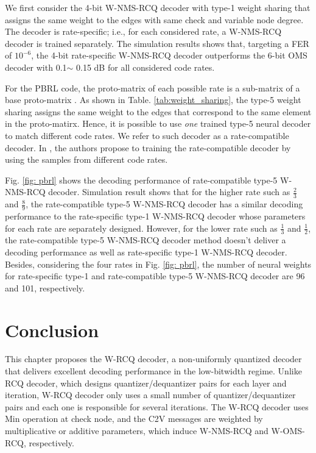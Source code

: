 \documentclass [PhD] {uclathes}
\begin{document}
We first consider the 4-bit W-NMS-RCQ decoder with type-1 weight sharing that assigns the same weight to the edges with same check and variable node degree.
The decoder is rate-specific; i.e., for each considered rate, a W-NMS-RCQ decoder is trained separately.
The simulation results shows that, targeting a FER of $10^{-6}$, the 4-bit rate-specific W-NMS-RCQ decoder outperforms the 6-bit OMS decoder with 0.1$\sim$ 0.15 dB for all considered code rates.

For the PBRL code, the proto-matrix of each possible rate is a sub-matrix of a base proto-matrix \cite{PBRL}. As shown in Table. \ref{tab:weight_sharing}, the type-5 weight sharing assigns the same weight to the edges that correspond to the same element in the proto-matirx. Hence, it is possible to use \emph{one} trained type-5 neural decoder to match different code rates. We refer to such decoder as a rate-compatible decoder. In \cite{dai2021learning}, the authors propose to training the rate-compatible decoder by using the samples from different code rates. 

Fig. \ref{fig: pbrl} shows the decoding performance of rate-compatible type-5 W-NMS-RCQ decoder. Simulation result shows that for the higher rate such as $\frac{2}{3}$ and $\frac{8}{9}$, the rate-compatible type-5 W-NMS-RCQ decoder has a similar decoding performance to the rate-specific type-1 W-NMS-RCQ decoder whose parameters for each rate  are separately designed.  However, for the lower rate such as $\frac{1}{3}$ and $\frac{1}{2}$, the rate-compatible type-5 W-NMS-RCQ decoder method doesn't deliver a decoding performance as well as rate-specific type-1 W-NMS-RCQ decoder.
Besides, considering the four rates in Fig. \ref{fig: pbrl}, the number of neural weights for rate-specific type-1 and rate-compatible type-5  W-NMS-RCQ decoder are 96 and 101, respectively.

\section{Conclusion}\label{sec: conclusion_c2}
This chapter proposes the W-RCQ decoder, a non-uniformly quantized decoder that delivers excellent decoding performance in the low-bitwidth regime.
Unlike RCQ decoder, which designs quantizer/dequantizer pairs for each layer and iteration, W-RCQ decoder only uses a small number of quantizer/dequantizer pairs and each one is responsible for several iterations. 
The W-RCQ decoder uses Min operation at check node, and the C2V messages are weighted by multiplicative or additive parameters, which induce W-NMS-RCQ and W-OMS-RCQ, respectively. 
\end{document}
